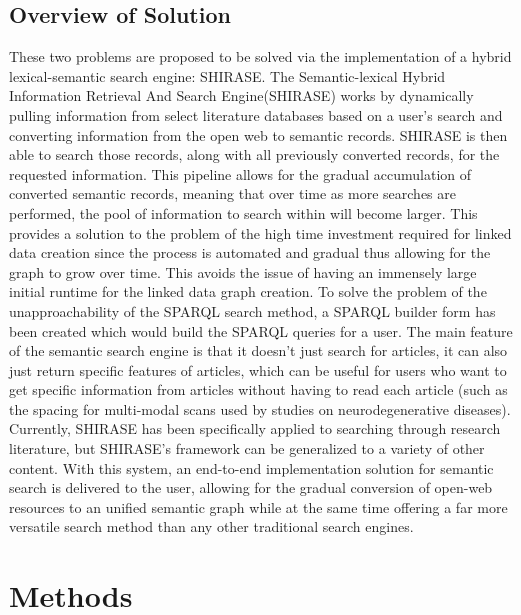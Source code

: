 \documentclass[12pt]{article}
\begin{document}
	\subsection{Overview of Solution}
	\quad These two problems are proposed to be solved via the implementation of a hybrid lexical-semantic search engine: SHIRASE. The Semantic-lexical Hybrid Information Retrieval And Search Engine(SHIRASE) works by dynamically pulling information from select literature databases based on a user's search and converting information from the open web to semantic records. SHIRASE is then able to search those records, along with all previously converted records, for the requested information. This pipeline allows for the gradual accumulation of converted semantic records, meaning that over time as more searches are performed, the pool of information to search within will become larger. This provides a solution to the problem of the high time investment required for linked data creation since the process is automated and gradual thus allowing for the graph to grow over time. This avoids the issue of having an immensely large initial runtime for the linked data graph creation. To solve the problem of the unapproachability of the SPARQL search method, a SPARQL builder form has been created which would build the SPARQL queries for a user. The main feature of the semantic search engine is that it doesn’t just search for articles, it can also just return specific features of articles, which can be useful for users who want to get specific information from articles without having to read each article (such as the spacing for multi-modal scans used by studies on neurodegenerative diseases). Currently, SHIRASE has been specifically applied to searching through research literature, but SHIRASE's framework can be generalized to a variety of other content. With this system, an end-to-end implementation solution for semantic search is delivered to the user, allowing for the gradual conversion of open-web resources to an unified semantic graph while at the same time offering a far more versatile search method than any other traditional search engines.
	
	\section{Methods}
	
\end{document}
